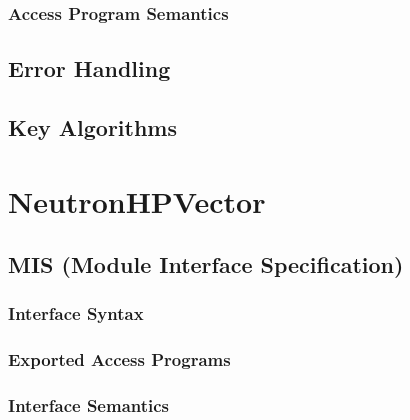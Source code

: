 \documentclass[12pt]{article}
\begin{document}
\subsubsection{Access Program Semantics}%

\subsection{Error Handling}

\subsection{Key Algorithms}


\section{NeutronHPVector}

\subsection{MIS (Module Interface Specification)}
\subsubsection{Interface Syntax}%

\subsubsection{Exported Access Programs}%

\subsubsection{Interface Semantics}
\end{document}
